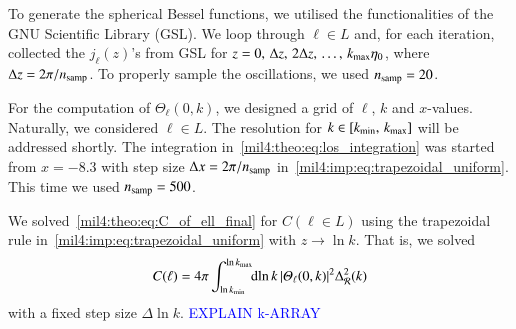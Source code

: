 To generate the spherical Bessel functions, we utilised the functionalities of the GNU Scientific Library (GSL). We loop through $\ell \in L$ and, for each iteration, collected the $j_\ell(z)$'s from GSL for $z=0,\,\Delta z,\, 2\Delta z,\, \dots,\, k_\mathrm{max}\eta_0$, where $\Delta z = 2\pi/n_\mathrm{samp}$. To properly sample the oscillations, we used $n_\mathrm{samp}=20$. 

For the computation of $\Theta_\ell(0,k)$, we designed a grid of $\ell$, $k$ and $x$-values. Naturally, we considered $\ell \in L$. The resolution for $k\in [k_\mathrm{min},\,k_\mathrm{max}]$ will be addressed shortly. The integration in~\cref{mil4:theo:eq:los_integration} was started from $x=-8.3$ with step size $\Delta x= 2\pi/n_\mathrm{samp}$ in~\cref{mil4:imp:eq:trapezoidal_uniform}. This time we used $n_\mathrm{samp}=500$. 

We solved~\cref{mil4:theo:eq:C_of_ell_final} for $C(\ell\in L)$ using the trapezoidal rule in~\cref{mil4:imp:eq:trapezoidal_uniform} with $z\to\ln{k}$. That is, we solved
\begin{equation}
    C(\ell) = 4\pi \int_{\ln{k\ensuremath{_\mathrm{min}}}}^{\ln{k\ensuremath{_\mathrm{max}}}} \!\!\mathop{}\!\mathrm{d} {\ln{k}}\, \abs{\varTheta_\ell(0,k)}^2 \Delta_\mathcal{R}^2(k)
\end{equation}
with a fixed step size $\Delta\!\ln{k}$. \textcolor{blue}{EXPLAIN k-ARRAY}